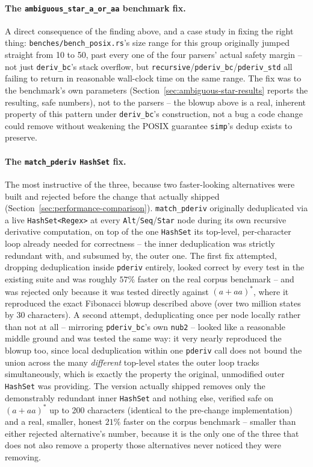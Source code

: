 \paragraph{The \texttt{ambiguous\_star\_a\_or\_aa} benchmark fix.} A
direct consequence of the finding above, and a case study in fixing the
right thing: \texttt{benches/bench\_posix.rs}'s size range for this group
originally jumped straight from 10 to 50, past every one of the four
parsers' actual safety margin -- not just \texttt{deriv\_bc}'s stack
overflow, but \texttt{recursive}/\texttt{pderiv\_bc}/\texttt{pderiv\_std}
all failing to return in reasonable wall-clock time on the same range.
The fix was to the benchmark's own parameters (Section~\ref{sec:ambiguous-star-results}
reports the resulting, safe numbers), not to the parsers -- the blowup
above is a real, inherent property of this pattern under
\texttt{deriv\_bc}'s construction, not a bug a code change could remove
without weakening the POSIX guarantee \texttt{simp}'s dedup exists to
preserve.

\paragraph{The \texttt{match\_pderiv} \texttt{HashSet} fix.} The most
instructive of the three, because two faster-looking alternatives were
built and rejected before the change that actually shipped
(Section~\ref{sec:performance-comparison}). \texttt{match\_pderiv}
originally deduplicated via a live \texttt{HashSet<Regex>} at every
\texttt{Alt}/\texttt{Seq}/\texttt{Star} node during its own recursive
derivative computation, on top of the one \texttt{HashSet} its
top-level, per-character loop already needed for correctness -- the
inner deduplication was strictly redundant with, and subsumed by, the
outer one. The first fix attempted, dropping deduplication inside
\texttt{pderiv} entirely, looked correct by every test in the existing
suite and was roughly $57\%$ faster on the real corpus benchmark -- and
was rejected only because it was tested directly against $(a+aa)^{*}$,
where it reproduced the exact Fibonacci blowup described above (over two
million states by 30 characters). A second attempt, deduplicating once
per node locally rather than not at all -- mirroring \texttt{pderiv\_bc}'s
own \texttt{nub2} -- looked like a reasonable middle ground and was
tested the same way: it very nearly reproduced the blowup too, since
local deduplication within one \texttt{pderiv} call does not bound the
union across the many \emph{different} top-level states the outer loop
tracks simultaneously, which is exactly the property the original,
unmodified outer \texttt{HashSet} was providing. The version actually
shipped removes only the demonstrably redundant inner \texttt{HashSet}
and nothing else, verified safe on $(a+aa)^{*}$ up to 200 characters
(identical to the pre-change implementation) and a real, smaller,
honest $21\%$ faster on the corpus benchmark -- smaller than either
rejected alternative's number, because it is the only one of the three
that does not also remove a property those alternatives never noticed
they were removing.

